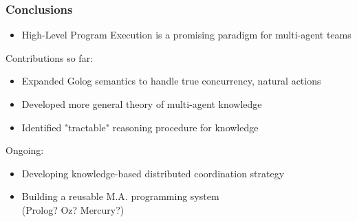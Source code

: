 \documentclass{beamer}
\begin{document}
\begin{frame}
\frametitle{Conclusions}
\begin{itemize}
  \item High-Level Program Execution is a promising paradigm for multi-agent teams
\end{itemize}
\pause
Contributions so far:
\begin{itemize}
  \item Expanded Golog semantics to handle true concurrency, natural actions
  \item Developed more general theory of multi-agent knowledge
  \item Identified "tractable" reasoning procedure for knowledge
\end{itemize}
\pause
Ongoing:
\begin{itemize}
  \item Developing knowledge-based distributed coordination strategy
  \item Building a reusable M.A. programming system\\(Prolog? Oz? Mercury?)
\end{itemize}
\end{frame}



\end{document}
